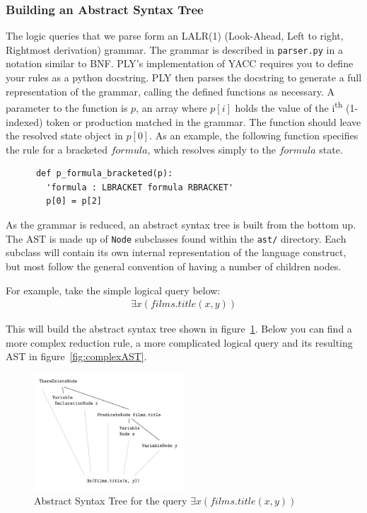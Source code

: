 \documentclass[a4paper, 11pt]{article}
\begin{document}
      \subsubsection{Building an Abstract Syntax Tree}

      The logic queries that we parse form an LALR(1) (Look-Ahead, Left to
      right, Rightmost derivation) grammar\cite{sittingacrossthere}. The
      grammar is described in \texttt{parser.py} in a notation similar to BNF.
      PLY's implementation of YACC requires you to define your rules as a
      python docstring. PLY then parses the docstring to generate a full
      representation of the grammar, calling the defined functions as
      necessary. A parameter to the function is $p$, an array where $p[i]$
      holds the value of the i\textsuperscript{th} (1-indexed) token or
      production matched in the
      grammar. The function should leave the resolved state object in $p[0]$.
      As an example, the following function specifies the rule for a bracketed
      $formula$, which resolves simply to the $formula$ state. 
      \begin{verbatim}
      def p_formula_bracketed(p):
        'formula : LBRACKET formula RBRACKET'
        p[0] = p[2]
      \end{verbatim}

      As the grammar is reduced, an abstract syntax tree is built from the
      bottom up. The AST is made up of \texttt{Node} subclasses found within
      the \texttt{ast/}
      directory. Each subclass will contain its own internal representation of
      the language construct, but most follow the general convention of having
      a number of children nodes.

      For example, take the simple logical query below:
      \begin{gather}
        \exists x(films.title(x, y))
      \end{gather}

      This will build the abstract syntax tree shown in
      figure~\ref{fig:simpleAST}. Below you can find a more complex reduction rule, 
      a more complicated logical query and its resulting AST in
      figure~\ref{fig:complexAST}.

      \begin{figure}
      \centering
      \includegraphics[width=0.5\textwidth]{images/ASTSimple.png}
      \caption{Abstract Syntax Tree for the query $\exists x(films.title(x, y))$}
      \label{fig:simpleAST}
      \end{figure}
\end{document}
